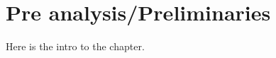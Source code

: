 \chapter{Pre analysis/Preliminaries}\label{ch:preliminaries}
Here is the intro to the chapter.





